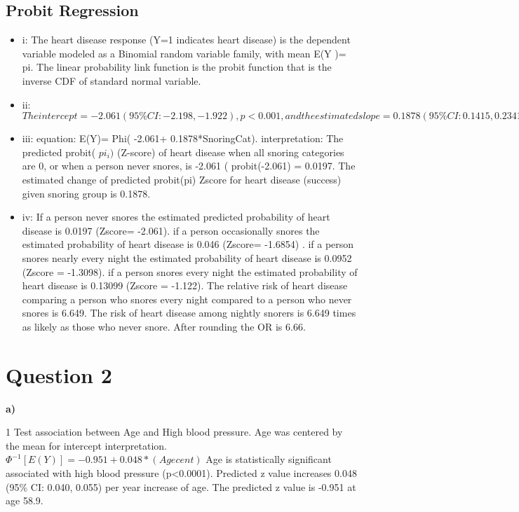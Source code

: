 \documentclass{article}
\begin{document}
 \subsection{Probit Regression}
  \begin{itemize}
     \item i: The heart disease response (Y=1 indicates heart disease) is the dependent variable modeled as a Binomial random variable family, with mean E(Y )= pi.  The linear probability link function is the probit function that is the inverse CDF of standard normal variable.
     \item ii: $The intercept =-2.061 (95\%CI: -2.198, -1.922), p<0.001, and the estimated slope= 0.1878 (95\% CI : 0.1415, 0.2341; p<0.001).$
     \item iii:  equation:  E(Y)= Phi( -2.061+ 0.1878*SnoringCat). interpretation: The predicted probit( $pi_i)$ (Z-score) of heart disease when all snoring categories are 0, or when a person never snores, is -2.061 ( probit(-2.061) = 0.0197.  The estimated change of predicted probit(pi) Zscore for heart disease (success) given snoring group is 0.1878.
 \item iv:  If a person never snores the estimated predicted probability of heart disease is 0.0197 (Zscore= -2.061).
 if a person occasionally snores the estimated probability of heart disease is 0.046 (Zscore= -1.6854) .
 if a person snores nearly every night the estimated probability of heart disease is 0.0952 (Zscore = -1.3098).
 if a person snores every night the estimated probability of heart disease is 0.13099 (Zscore = -1.122).
The relative risk of heart disease comparing a person who snores every night compared to a person who never snores is 6.649.  The risk of heart disease among nightly snorers is 6.649 times as likely as those who never snore. After rounding the OR is 6.66.
 \end{itemize}
 
 
\section*{Question 2}

\textbf{a)}

1 Test association between Age and High blood pressure. Age was centered by the mean for intercept interpretation.  \\
$\Phi^{-1}[E(Y)]=-0.951+0.048*(Age cent)$
Age is statistically significant associated with high blood pressure (p<0.0001). Predicted z value increases 0.048 (95\% CI: 0.040, 0.055) per year increase of age. The predicted z value is -0.951 at age 58.9.
\end{document}
